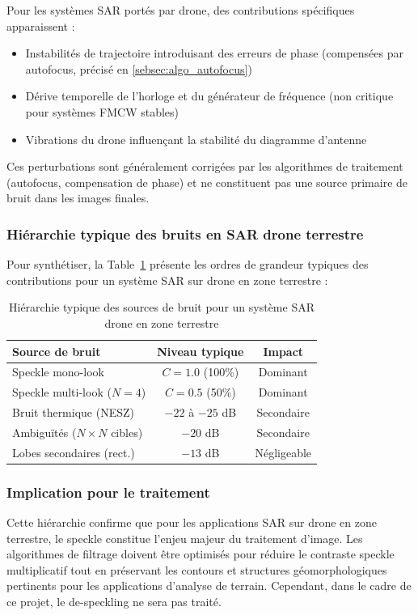 
Pour les systèmes SAR portés par drone, des contributions spécifiques apparaissent \cite{grathwohl2025uavbased} :
\begin{itemize}
\item Instabilités de trajectoire introduisant des erreurs de phase (compensées par autofocus, précisé en \ref{sebsec:algo_autofocus})
\item Dérive temporelle de l'horloge et du générateur de fréquence (non critique pour systèmes FMCW stables)
\item Vibrations du drone influençant la stabilité du diagramme d'antenne
\end{itemize}

Ces perturbations sont généralement corrigées par les algorithmes de traitement (autofocus, compensation de phase) et ne constituent pas une source primaire de bruit dans les images finales.

\subsubsection{Hiérarchie typique des bruits en SAR drone terrestre}

Pour synthétiser, la Table~\ref{tab:noise_hierarchy_uav} présente les ordres de grandeur typiques des contributions pour un système SAR sur drone en zone terrestre :

\FloatBarrier
\begin{table}[h!]
\centering
\begin{tabular}{lcc}
\hline
\textbf{Source de bruit} & \textbf{Niveau typique} & \textbf{Impact} \\
\hline
Speckle mono-look & \(C = 1.0\) (100\%) & Dominant \\
Speckle multi-look (\(N=4\)) & \(C = 0.5\) (50\%) & Dominant \\
Bruit thermique (NESZ) & \(-22\) à \(-25\) dB & Secondaire \\
Ambiguïtés (\(N \times N\) cibles) & \(-20\) dB & Secondaire \\
Lobes secondaires (rect.) & \(-13\) dB & Négligeable \\
\hline
\end{tabular}
\caption{Hiérarchie typique des sources de bruit pour un système SAR drone en zone terrestre}
\label{tab:noise_hierarchy_uav}
\end{table}
\FloatBarrier
\subsubsection{Implication pour le traitement}

Cette hiérarchie confirme que pour les applications SAR sur drone en zone terrestre, le speckle constitue l'enjeu majeur du traitement d'image. Les algorithmes de filtrage doivent être optimisés pour réduire le contraste speckle multiplicatif tout en préservant les contours et structures géomorphologiques pertinents pour les applications d'analyse de terrain. Cependant, dans le cadre de ce projet, le de-speckling ne sera pas traité.